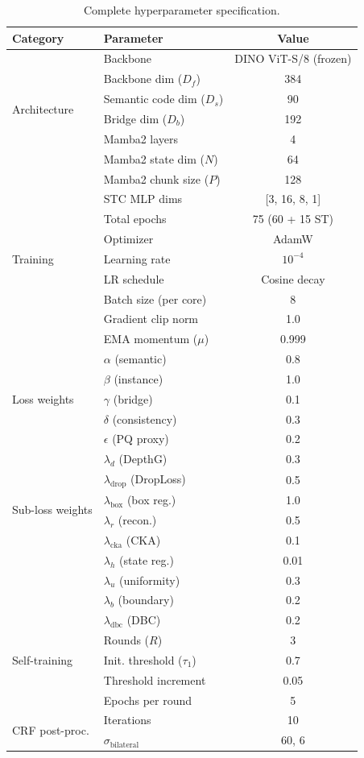 \documentclass{article}
\begin{document}
\begin{table}[h]
\centering
\caption{Complete hyperparameter specification.}
\label{tab:hyperparams}
\begin{tabular}{llc}
\toprule
\textbf{Category} & \textbf{Parameter} & \textbf{Value} \\
\midrule
\multirow{6}{*}{Architecture} & Backbone & DINO ViT-S/8 (frozen) \\
& Backbone dim ($D_f$) & 384 \\
& Semantic code dim ($D_s$) & 90 \\
& Bridge dim ($D_b$) & 192 \\
& Mamba2 layers & 4 \\
& Mamba2 state dim ($N$) & 64 \\
& Mamba2 chunk size ($P$) & 128 \\
& STC MLP dims & [3, 16, 8, 1] \\
\midrule
\multirow{5}{*}{Training} & Total epochs & 75 (60 + 15 ST) \\
& Optimizer & AdamW \\
& Learning rate & $10^{-4}$ \\
& LR schedule & Cosine decay \\
& Batch size (per core) & 8 \\
& Gradient clip norm & 1.0 \\
& EMA momentum ($\mu$) & 0.999 \\
\midrule
\multirow{5}{*}{Loss weights} & $\alpha$ (semantic) & 0.8 \\
& $\beta$ (instance) & 1.0 \\
& $\gamma$ (bridge) & 0.1 \\
& $\delta$ (consistency) & 0.3 \\
& $\epsilon$ (PQ proxy) & 0.2 \\
\midrule
\multirow{6}{*}{Sub-loss weights} & $\lambda_d$ (DepthG) & 0.3 \\
& $\lambda_{\text{drop}}$ (DropLoss) & 0.5 \\
& $\lambda_{\text{box}}$ (box reg.) & 1.0 \\
& $\lambda_r$ (recon.) & 0.5 \\
& $\lambda_{\text{cka}}$ (CKA) & 0.1 \\
& $\lambda_h$ (state reg.) & 0.01 \\
& $\lambda_u$ (uniformity) & 0.3 \\
& $\lambda_b$ (boundary) & 0.2 \\
& $\lambda_{\text{dbc}}$ (DBC) & 0.2 \\
\midrule
\multirow{3}{*}{Self-training} & Rounds ($R$) & 3 \\
& Init. threshold ($\tau_1$) & 0.7 \\
& Threshold increment & 0.05 \\
& Epochs per round & 5 \\
\midrule
\multirow{2}{*}{CRF post-proc.} & Iterations & 10 \\
& $\sigma_{\text{bilateral}}$ & 60, 6 \\
\bottomrule
\end{tabular}
\end{table}
\end{document}
